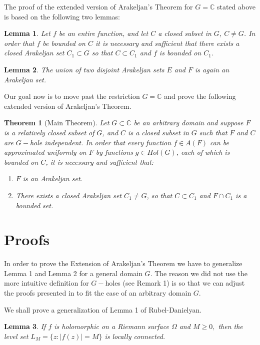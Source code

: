 \documentclass[12pt]{article}
\newtheorem{thm}{Theorem}
\newtheorem{lem}{Lemma}
\begin{document}
 The proof of the extended version of Arakeljan's Theorem for $G=\mathbb{C}$ stated above is based on the following two lemmas: 

\begin{lem} Let $f$ be an entire function, and let $C$ a closed subset in $G$, $C\not=G$. In order that $f$ be bounded on $C$ it is necessary and sufficient that there exists a closed Arakeljan set $C_1\subset G$ so that $C\subset C_1$ and $f$ is bounded on $C_1$.
\end{lem}

\begin{lem}
The union of two disjoint Arakeljan sets $E$ and $F$ is again an Arakeljan set.
\end{lem}

Our goal now is to move past the restriction $G=\mathbb{C}$ and prove the following extended version of Arakeljan's Theorem.

\begin{thm}[Main Theorem]
Let $G\subset \mathbb{C}$ be an arbitrary domain and suppose $F$ is a relatively closed subset of $G$, and $C$ is a closed subset in $G$ such that \(F\) and \(C\) are \(G-\)hole independent. In order that every function $f\in A(F)$ can be approximated uniformly on $F$ by functions $g\in Hol(G)$, each of which is bounded on $C$, it is necessary and sufficient that: \begin{enumerate}
\item $F$ is an Arakeljan set.
\item There exists a closed Arakeljan set $C_1\not=G$, so that $C\subset C_1$ and $F\cap C_1$ is a bounded set.
\end{enumerate}
\end{thm}

\section*{Proofs}
 In order to prove the Extension of Arakeljan's Theorem we have to generalize {Lemma 1} and Lemma 2 for a general domain $G$. The reason we did not use the more intuitive definition for $G-$holes (see {Remark 1}) is so that we can adjust the proofs presented in \cite{RU} to fit the case of an arbitrary domain $G$.
 
\noindent We shall prove a generalization of Lemma 1 of Rubel-Danielyan. 



\begin{lem}\label{level}
If $f$ is holomorphic on a Riemann surface $\Omega$ and $M\ge 0,$ then the level set $L_M=\{z:|f(z)|= M\}$ is locally connected. 
\end{lem}
\end{document}
